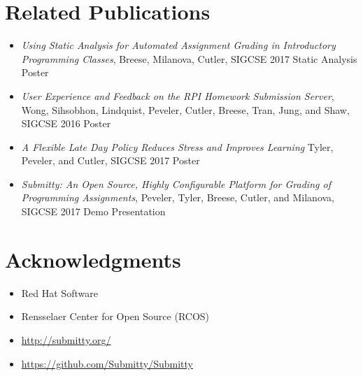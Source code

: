 \documentclass[thesis]{hmcposter}
\begin{document}
\begin{poster}
\section{Related Publications}
\begin{itemize}
\item \textit{Using Static Analysis for Automated Assignment Grading in Introductory Programming Classes}, Breese, Milanova, Cutler, SIGCSE 2017 Static Analysis Poster 
\item \textit{User Experience and Feedback on the RPI Homework Submission Server}, Wong, Sihsobhon, Lindquist, Peveler, Cutler, Breese, Tran, Jung, and Shaw, SIGCSE 2016 Poster 
\item \textit{A Flexible Late Day Policy Reduces Stress and Improves Learning} Tyler, Peveler, and Cutler,
SIGCSE 2017 Poster
\item \textit{Submitty: An Open Source, Highly Configurable Platform for Grading of Programming Assignments}, Peveler, Tyler, Breese, Cutler, and Milanova, SIGCSE 2017 Demo Presentation
\end{itemize}

\section{Acknowledgments}
\begin{itemize}
    \item Red Hat Software
    \item Rensselaer Center for Open Source (RCOS)
    \item \url{http://submitty.org/}
    \item \url{https://github.com/Submitty/Submitty}
\end{itemize}

\end{poster}
\end{document}
